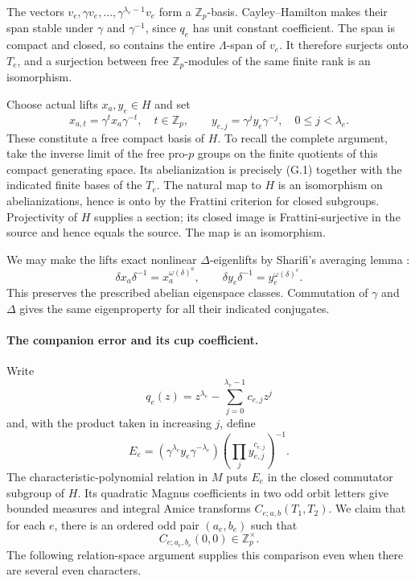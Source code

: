 \documentclass[11pt,a4paper]{article}
\theoremstyle{definition}
\begin{document}
The vectors $v_e,\gamma v_e,\ldots,\gamma^{\lambda_e-1}v_e$ form a $\mathbb Z_p$-basis. Cayley--Hamilton makes their span stable under $\gamma$ and $\gamma^{-1}$, since $q_e$ has unit constant coefficient. The span is compact and closed, so contains the entire $\Lambda$-span of $v_e$. It therefore surjects onto $T_e$, and a surjection between free $\mathbb Z_p$-modules of the same finite rank is an isomorphism.

Choose actual lifts $x_a,y_e\in H$ and set
\[
 x_{a,t}=\gamma^t x_a\gamma^{-t},\quad t\in\mathbb Z_p,
 \qquad y_{e,j}=\gamma^j y_e\gamma^{-j},\quad0\le j<\lambda_e.
\]
These constitute a free compact basis of $H$. To recall the complete argument, take the inverse limit of the free pro-$p$ groups on the finite quotients of this compact generating space. Its abelianization is precisely (G.1) together with the indicated finite bases of the $T_e$. The natural map to $H$ is an isomorphism on abelianizations, hence is onto by the Frattini criterion for closed subgroups. Projectivity of $H$ supplies a section; its closed image is Frattini-surjective in the source and hence equals the source. The map is an isomorphism.

We may make the lifts exact nonlinear $\Delta$-eigenlifts by Sharifi's averaging lemma \cite[Lemma~2.1, pp.~3--4]{Sharifi2002}:
\[
 \delta x_a\delta^{-1}=x_a^{\omega(\delta)^a},\qquad
 \delta y_e\delta^{-1}=y_e^{\omega(\delta)^e}.
\]
This preserves the prescribed abelian eigenspace classes. Commutation of $\gamma$ and $\Delta$ gives the same eigenproperty for all their indicated conjugates.

\paragraph{The companion error and its cup coefficient.}
Write
\[
 q_e(z)=z^{\lambda_e}-\sum_{j=0}^{\lambda_e-1}c_{e,j}z^j
\]
and, with the product taken in increasing $j$, define
\[
 E_e=(\gamma^{\lambda_e}y_e\gamma^{-\lambda_e})
          \left(\prod_jy_{e,j}^{c_{e,j}}\right)^{-1}.
\]
The characteristic-polynomial relation in $M$ puts $E_e$ in the closed commutator subgroup of $H$. Its quadratic Magnus coefficients in two odd orbit letters give bounded measures and integral Amice transforms $C_{e;a,b}(T_1,T_2)$. We claim that for each $e$, there is an ordered odd pair $(a_e,b_e)$ such that
\[
 C_{e;a_e,b_e}(0,0)\in\mathbb Z_p^\times.                       \tag{G.3}
\]
The following relation-space argument supplies this comparison even when there are several even characters.
\end{document}
